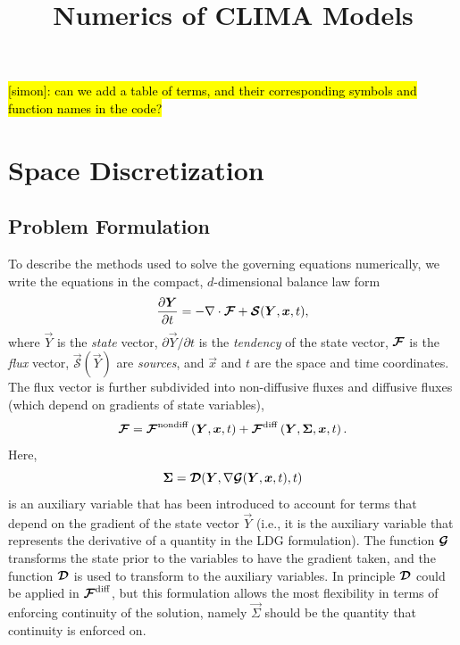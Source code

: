 \documentclass{report}
\title{Numerics of CLIMA Models}
\author{}
\begin{document}
\maketitle
\tableofcontents

\hl{[simon]:  can we add a table of terms, and their corresponding symbols and function names in the code?}

\chapter{Space Discretization}


\section{Problem Formulation}

To describe the methods used to solve the governing equations numerically, we write the equations in the compact, $d$-dimensional balance law form 
\begin{equation}\label{e:eom_compact}
\frac{\partial \boldsymbol{{Y}}}{\partial t}  =  - \nabla \cdot \boldsymbol{{\mathcal{F}}} + \boldsymbol{{\mathcal{S}}}(\boldsymbol{{Y}}, \boldsymbol{{x}}, t),
\end{equation}
where $\vec{Y}$ is the \emph{state} vector, $\partial\vec{Y}/\partial t$ is the \emph{tendency} of the state vector, $\boldsymbol{{\mathcal{F}}}$ is the \emph{flux} vector, $\vec{\mathcal{S}}(\vec{Y})$ are \emph{sources}, and $\vec{x}$ and $t$ are the space and time coordinates. The flux vector is further subdivided into non-diffusive fluxes and diffusive fluxes (which depend on gradients of state variables),
\begin{equation}
    \boldsymbol{{\mathcal{F}}} = \boldsymbol{{\mathcal{F}}}^{\mathrm{nondiff}}\left(\boldsymbol{{Y}}, \boldsymbol{{x}}, t\right) + \boldsymbol{{\mathcal{F}}}^{\mathrm{diff}}\left(\boldsymbol{{Y}}, \boldsymbol{{\Sigma}}, \boldsymbol{{x}}, t\right).
\end{equation}
Here, 
\begin{equation}
    \boldsymbol{{\Sigma}} = \boldsymbol{{\mathcal{D}}}(\boldsymbol{{Y}}, \nabla \boldsymbol{{\mathcal{G}}}(\boldsymbol{{Y}}, \boldsymbol{{x}}, t), t)
\end{equation}
is an auxiliary variable that has been introduced to account for terms that depend on the gradient of the state vector $\vec{Y}$ (i.e., it is the auxiliary variable that represents the derivative of a quantity in the LDG formulation). The function $\boldsymbol{{\mathcal{G}}}$ transforms the state prior to the variables to have the gradient taken, and the function $\boldsymbol{{\mathcal{D}}}$ is used to transform to the auxiliary variables. In principle $\boldsymbol{{\mathcal{D}}}$ could be applied in $\boldsymbol{{\mathcal{F}}}^{\mathrm{diff}}$, but this formulation allows the most flexibility in terms of enforcing continuity of the solution, namely $\vec{\Sigma}$ should be the quantity that continuity is enforced on.
\end{document}
